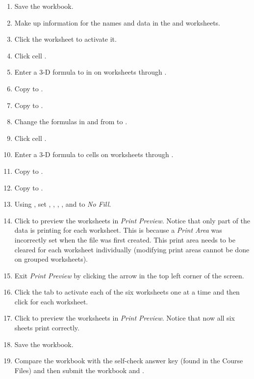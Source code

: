 \begin{enumerate}[resume]
	\item Save the  workbook.
	\item Make up information for the names and data in the  and  worksheets.
	\item Click the  worksheet to activate it.

	\item Click cell . 
	\item Enter a $ 3 $-D formula to  in  on worksheets  through . 
	\item Copy  to .
	\item Copy  to .
	\item Change the formulas in  and  from  to .
	\item Click cell . 
	\item Enter a $ 3 $-D formula to  cells  on worksheets  through . 
	\item Copy  to .
	\item Copy  to .
	\item Using , set , , , , and  to \textit{No Fill}. 
	\item Click  to preview the worksheets in \textit{Print Preview}. Notice that only part of the data is printing for each worksheet. This is because a \textit{Print Area} was incorrectly set when the file was first created. This print area needs to be cleared for each worksheet individually (modifying print areas cannot be done on grouped worksheets). 
	\item Exit \textit{Print Preview} by clicking the arrow in the top left corner of the screen. 
	\item Click the tab to activate each of the six worksheets one at a time and then click  for each worksheet.
	\item Click  to preview the worksheets in \textit{Print Preview}. Notice that now all six sheets print correctly.
	\item Save the  workbook.
	\item Compare the workbook with the self-check answer key (found in the Course Files) and then submit the  workbook and .
\end{enumerate}

